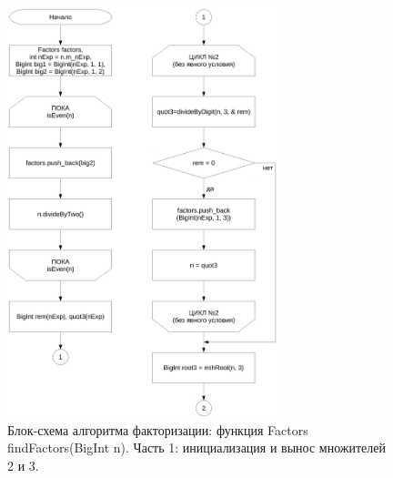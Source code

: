 \documentclass[a4paper,12pt]{article} %
\begin{document}
\begin{figure}[ht]
	\centering
	\includegraphics[width=0.7\textwidth]{lr7_findFactors-1.pdf}
	\caption{
		Блок-схема алгоритма факторизации: функция Factors findFactors(BigInt n).
		Часть 1: инициализация и вынос множителей 2 и 3.
	}
\end{figure}
\end{document}
